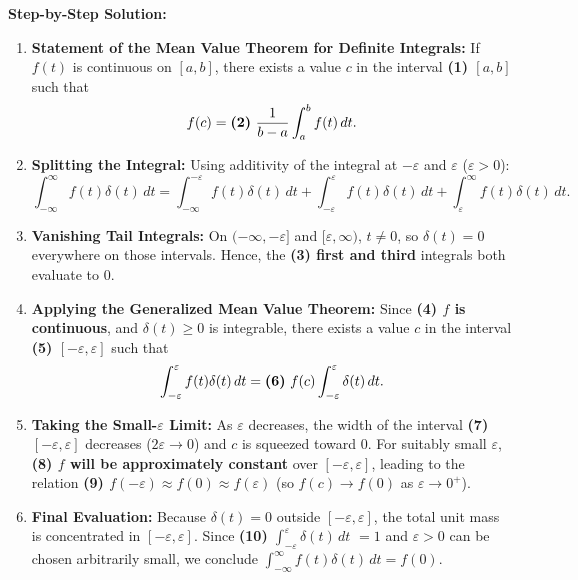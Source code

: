 \documentclass[11pt, letterpaper]{article}
\theoremstyle{definition}
\theoremstyle{remark}
\begin{document}
\textbf{Step-by-Step Solution:}
\begin{enumerate}
    \item \textbf{Statement of the Mean Value Theorem for Definite Integrals:} If $f(t)$ is continuous on $[a, b]$, there exists a value $c$ in the interval \textbf{(1) $[a, b]$} such that
    \[
        f(c) = \text{\textbf{(2)} } \frac{1}{b - a}\int_{a}^{b} f(t)\,dt.
    \]

    \item \textbf{Splitting the Integral:} Using additivity of the integral at $-\varepsilon$ and $\varepsilon$ ($\varepsilon > 0$):
    \[
        \int_{-\infty}^{\infty} f(t)\delta(t)\,dt = \int_{-\infty}^{\boxed{-\varepsilon}} f(t)\delta(t)\,dt + \int_{\boxed{-\varepsilon}}^{\boxed{\varepsilon}} f(t)\delta(t)\,dt + \int_{\boxed{\varepsilon}}^{\infty} f(t)\delta(t)\,dt.
    \]

    \item \textbf{Vanishing Tail Integrals:} On $(-\infty, -\varepsilon]$ and $[\varepsilon, \infty)$, $t \neq 0$, so $\delta(t) = 0$ everywhere on those intervals. Hence, the \textbf{(3) first and third} integrals both evaluate to $\boxed{0}$.

    \item \textbf{Applying the Generalized Mean Value Theorem:} Since \textbf{(4) $f$ is continuous}, and $\delta(t) \ge 0$ is integrable, there exists a value $c$ in the interval \textbf{(5) $[-\varepsilon, \varepsilon]$} such that
    \[
        \int_{-\varepsilon}^{\varepsilon} f(t)\delta(t)\,dt = \text{\textbf{(6)} } f(c)\int_{-\varepsilon}^{\varepsilon} \delta(t)\,dt.
    \]

    \item \textbf{Taking the Small-$\varepsilon$ Limit:} As $\varepsilon$ decreases, the width of the interval \textbf{(7) $[-\varepsilon, \varepsilon]$} decreases ($2\varepsilon \to 0$) and $c$ is squeezed toward $0$. For suitably small $\varepsilon$, \textbf{(8) $f$ will be approximately constant} over $[-\varepsilon, \varepsilon]$, leading to the relation \textbf{(9) $f(-\varepsilon) \approx f(0) \approx f(\varepsilon)$} (so $f(c) \to f(0)$ as $\varepsilon \to 0^+$).

    \item \textbf{Final Evaluation:} Because $\delta(t) = 0$ outside $[-\varepsilon, \varepsilon]$, the total unit mass is concentrated in $[-\varepsilon, \varepsilon]$. Since \textbf{(10) $\int_{-\varepsilon}^{\varepsilon} \delta(t)\,dt$} $= \boxed{1}$ and $\varepsilon > 0$ can be chosen arbitrarily small, we conclude $\int_{-\infty}^{\infty} f(t)\delta(t)\,dt = f(0)$.
\end{enumerate}
\end{document}
